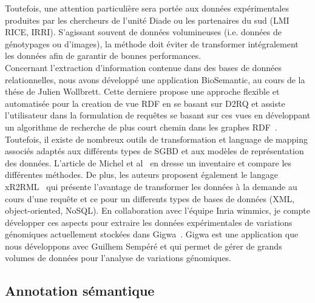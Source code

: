 Toutefois, une attention particulière sera portée aux données expérimentales produites par les chercheurs de l’unité Diade ou les partenaires du sud (LMI RICE, IRRI). S’agissant souvent de données volumineuses (i.e. données de génotypages ou d’images), la méthode doit éviter de transformer intégralement les données afin de garantir de bonnes performances.\\

Concernant l'extraction d'information contenue dans des bases de données relationnelles, nous avons développé une application BioSemantic, au cours de la thése de Julien Wollbrett. Cette derniere propose une approche flexible et automatisée pour la creation de vue RDF en se basant sur D2RQ  et assiste l'utilisateur dans la formulation de requêtes se basant sur ces vues en développant un algorithme de recherche de plus court chemin dans les graphes RDF~\cite{wollbrett2013clever}. Toutefois, il existe de nombreux outils de transformation et language de mapping associés adaptés aux différents types de SGBD et aux modèles de représentation des données. L'article de Michel et al~\cite{Antipolis2014} en dresse un inventaire et compare les différentes méthodes. De plus, les auteurs proposent également le langage xR2RML~\cite{Michel2015} qui présente l’avantage de transformer les données à la demande au cours d’une requête et ce pour un differents types de bases de données (XML, object-oriented, NoSQL). En collaboration avec l’équipe Inria wimmics, je compte développer ces aspects pour extraire les données expérimentales de variations génomiques actuellement stockées dans Gigwa~\cite{Sempere2016}. Gigwa est une application que nous développons avec Guilhem Sempéré et qui permet de gérer de grands volumes de données pour l’analyse de variations génomiques.


\subsection{Annotation sémantique}

